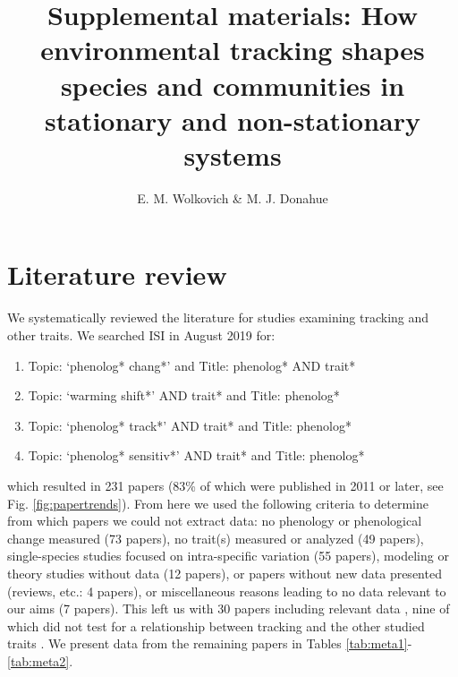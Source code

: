 \documentclass[11pt,letter]{article}
\begin{document}
\renewcommand{\refname}{\CHead{}}

\title{Supplemental materials:  How environmental tracking shapes species and communities in stationary and non-stationary systems} 

\author{E. M. Wolkovich \& M. J. Donahue}
\date{} 
\maketitle  %
\renewcommand{\thetable}{S\arabic{table}}
\renewcommand{\thefigure}{S\arabic{figure}}


\section{Literature review}
We systematically reviewed the literature for studies examining tracking and other traits. We searched ISI in August 2019 for:
\begin{enumerate}
\item Topic: `phenolog* chang*' and Title: phenolog* AND trait*
\item Topic: `warming shift*' AND trait* and Title: phenolog*
\item Topic: `phenolog* track*' AND trait* and Title: phenolog*
\item Topic: `phenolog* sensitiv*' AND trait* and Title: phenolog*
\end{enumerate}
which resulted in 231 papers (83\% of which were published in 2011 or later, see Fig. \ref{fig:papertrends}). From here we used the following criteria to determine from which papers we could not extract data: no phenology or phenological change measured (73 papers), no trait(s) measured or analyzed (49 papers), single-species studies focused on intra-specific variation (55 papers), modeling or theory studies without data (12 papers), or papers without new data presented (reviews, etc.: 4 papers), or miscellaneous reasons leading to no data relevant to our aims (7 papers). This left us with 30 papers including relevant data \citep{Suzuki:1997gf,Post1999,adrian2006,Xu:2009an,Goodenough2010,Diamond:2011nx,Moussus2011,Szilvia2012,Dorji2013,Ishioka2013,xia2013,Bock2014,kharouba2014,Vegvari2015,bell2015,jing2016,lasky2016,McDermott2016,Zhu2016BioLetters,brooks2017,du2017,munson2017,arfinkhan2018,zhang2018,Ladwig2019,park2019,sharma2019,Xavier2019,Zettlemoyer2019}, nine of which did not test for a relationship between tracking and the other studied traits \citep{Suzuki:1997gf,adrian2006,Xu:2009an,Szilvia2012,bell2015,McDermott2016,Sherwood2017,sharma2019,Xavier2019}. We present data from the remaining papers in Tables \ref{tab:meta1}-\ref{tab:meta2}. \\
\end{document}
